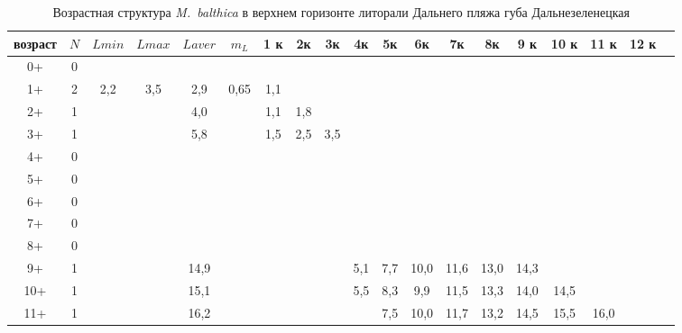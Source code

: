 \begin{landscape}
\begin{table}[h]
\caption{Возрастная структура {\it M.~balthica} в верхнем горизонте литорали Дальнего пляжа губа Дальнезеленецкая}
\label{tab:DP_vgl_growth_matrix}
\begin{tabular}{|c|c|cc|cc|ccccccccccccc|}
    \hline
возраст & $N$ & $L min$ & $L max$ & $L aver$ & $m_L$   & 1 к  & 2к   & 3к  & 4к   & 5к   & 6к   & 7к   & 8к   & 9 к  & 10 к & 11 к & 12 к &  \\ \hline
0+      & 0 &       &       &         &         &      &      &     &      &      &      &      &      &      &      &      &      &  \\
1+      & 2 & 2,2   & 3,5   & 2,9     & 0,65    & 1,1  &      &     &      &      &      &      &      &      &      &      &      &  \\
2+      & 1 &       &       & 4,0     &         & 1,1  & 1,8  &     &      &      &      &      &      &      &      &      &      &  \\
3+      & 1 &       &       & 5,8     &         & 1,5  & 2,5  & 3,5 &      &      &      &      &      &      &      &      &      &  \\
4+      & 0 &       &       &         &         &      &      &     &      &      &      &      &      &      &      &      &      &  \\
5+      & 0 &       &       &         &         &      &      &     &      &      &      &      &      &      &      &      &      &  \\
6+      & 0 &       &       &         &         &      &      &     &      &      &      &      &      &      &      &      &      &  \\
7+      & 0 &       &       &         &         &      &      &     &      &      &      &      &      &      &      &      &      &  \\
8+      & 0 &       &       &         &         &      &      &     &      &      &      &      &      &      &      &      &      &  \\
9+      & 1 &       &       & 14,9    &         &      &      &     & 5,1  & 7,7  & 10,0 & 11,6 & 13,0 & 14,3 &      &      &      &  \\
10+     & 1 &       &       & 15,1    &         &      &      &     & 5,5  & 8,3  & 9,9  & 11,5 & 13,3 & 14,0 & 14,5 &      &      &  \\
11+     & 1 &       &       & 16,2    &         &      &      &     &      & 7,5  & 10,0 & 11,7 & 13,2 & 14,5 & 15,5 & 16,0 &      &  \\

\end{tabular}
\end{table}
\end{landscape}
